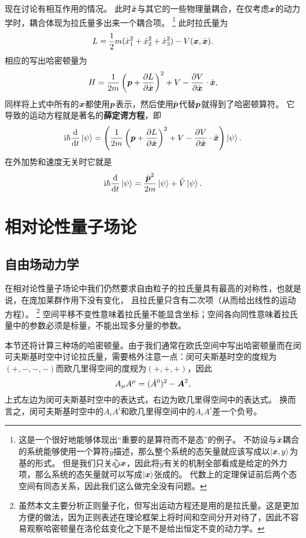 \documentclass[hyperref, UTF8, a4paper]{ctexart}
\newcommand*{\ii}{\mathrm{i}}
\begin{document}
现在讨论有相互作用的情况。
此时$\hat{\vb*{x}}$与其它的一些物理量耦合，在仅考虑$\vb*{x}$的动力学时，耦合体现为拉氏量多出来一个耦合项。%
\footnote{这是一个很好地能够体现出“重要的是算符而不是态”的例子。
不妨设与$\hat{\vb*{x}}$耦合的系统能够使用一个算符$\hat{y}$描述，那么整个系统的态矢量就应该写成以$\ket{\vb*{x}, y}$为基的形式。
但是我们只关心$\vb*{x}$，因此将$\hat{y}$有关的机制全部看成是给定的外力项，那么系统的态矢量就可以写成$\ket{\vb*{x}}$张成的。
代数上的定理保证前后两个态空间有同态关系，因此我们这么做完全没有问题。
}
此时拉氏量为
\begin{equation}
    L = \frac{1}{2} m (\dot{x}_1^2 + \dot{x}_2^2 + \dot{x}_3^2) - V(\vb*{x}, \dot{\vb*{x}}).
\end{equation}
相应的写出哈密顿量为
\[
    H = \frac{1}{2m} \left(\vb*{p} + \pdv{L}{\dot{\vb*{x}}}\right)^2 + V - \pdv{V}{\dot{\vb*{x}}} \cdot \dot{\vb*{x}},
\]
同样将上式中所有的$\vb*{x}$都使用$\vb*{p}$表示，然后使用$\hat{\vb*{p}}$代替$\vb*{p}$就得到了哈密顿算符。
它导致的运动方程就是著名的\textbf{薛定谔方程}，即
\begin{equation}
    \ii \hbar \dv{t} \ket{\psi} = \left( \frac{1}{2m} \left(\vb*{p} + \pdv{L}{\dot{\vb*{x}}}\right)^2 + V - \pdv{V}{\dot{\vb*{x}}} \cdot \dot{\vb*{x}} \right) \ket{\psi}.
\end{equation}
在外加势和速度无关时它就是
\begin{equation}
    \ii \hbar \dv{t} \ket{\psi} = \frac{\hat{\vb*{p}}^2}{2m} \ket{\psi} + \hat{V} \ket{\psi}.
\end{equation}

\section{相对论性量子场论}

\subsection{自由场动力学}\label{sec:qft-free-dynamics}

在相对论性量子场论中我们仍然要求自由粒子的拉氏量具有最高的对称性，也就是说，在庞加莱群作用下没有变化，
且拉氏量只含有二次项（从而给出线性的运动方程）。%
\footnote{虽然本文主要分析正则量子化，但写出运动方程还是用的是拉氏量。这是更加方便的做法，因为正则表述在理论框架上将时间和空间分开对待了，因此不容易观察哈密顿量在洛伦兹变化之下是不是给出恒定不变的动力学。}
空间平移不变性意味着拉氏量不能显含坐标；空间各向同性意味着拉氏量中的参数必须是标量，不能出现多分量的参数。

本节还将计算三种场的哈密顿量。由于我们通常在欧氏空间中写出哈密顿量而在闵可夫斯基时空中讨论拉氏量，需要格外注意一点：闵可夫斯基时空的度规为$(+, -, -, -)$而欧几里得空间的度规为$(+, +, +)$，因此
\[
    A_\mu A^\mu = (\dot{A}^0)^2 - \vb*{A}^2,
\]
上式左边为闵可夫斯基时空中的表达式，右边为欧几里得空间中的表达式。
换而言之，闵可夫斯基时空中的$A_i A^i$和欧几里得空间中的$A_i A^i$差一个负号。
\end{document}
